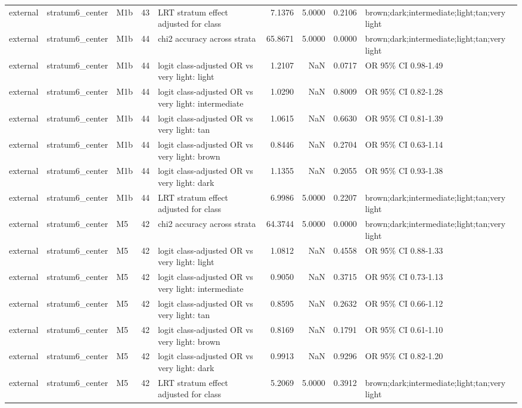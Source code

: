 \begin{tabular}{lllrlrrrl}
external & stratum6\_center & M1b & 43 & LRT stratum effect adjusted for class & 7.1376 & 5.0000 & 0.2106 & brown;dark;intermediate;light;tan;very light \\
external & stratum6\_center & M1b & 44 & chi2 accuracy across strata & 65.8671 & 5.0000 & 0.0000 & brown;dark;intermediate;light;tan;very light \\
external & stratum6\_center & M1b & 44 & logit class-adjusted OR vs very light: light & 1.2107 & NaN & 0.0717 & OR 95\% CI 0.98-1.49 \\
external & stratum6\_center & M1b & 44 & logit class-adjusted OR vs very light: intermediate & 1.0290 & NaN & 0.8009 & OR 95\% CI 0.82-1.28 \\
external & stratum6\_center & M1b & 44 & logit class-adjusted OR vs very light: tan & 1.0615 & NaN & 0.6630 & OR 95\% CI 0.81-1.39 \\
external & stratum6\_center & M1b & 44 & logit class-adjusted OR vs very light: brown & 0.8446 & NaN & 0.2704 & OR 95\% CI 0.63-1.14 \\
external & stratum6\_center & M1b & 44 & logit class-adjusted OR vs very light: dark & 1.1355 & NaN & 0.2055 & OR 95\% CI 0.93-1.38 \\
external & stratum6\_center & M1b & 44 & LRT stratum effect adjusted for class & 6.9986 & 5.0000 & 0.2207 & brown;dark;intermediate;light;tan;very light \\
external & stratum6\_center & M5 & 42 & chi2 accuracy across strata & 64.3744 & 5.0000 & 0.0000 & brown;dark;intermediate;light;tan;very light \\
external & stratum6\_center & M5 & 42 & logit class-adjusted OR vs very light: light & 1.0812 & NaN & 0.4558 & OR 95\% CI 0.88-1.33 \\
external & stratum6\_center & M5 & 42 & logit class-adjusted OR vs very light: intermediate & 0.9050 & NaN & 0.3715 & OR 95\% CI 0.73-1.13 \\
external & stratum6\_center & M5 & 42 & logit class-adjusted OR vs very light: tan & 0.8595 & NaN & 0.2632 & OR 95\% CI 0.66-1.12 \\
external & stratum6\_center & M5 & 42 & logit class-adjusted OR vs very light: brown & 0.8169 & NaN & 0.1791 & OR 95\% CI 0.61-1.10 \\
external & stratum6\_center & M5 & 42 & logit class-adjusted OR vs very light: dark & 0.9913 & NaN & 0.9296 & OR 95\% CI 0.82-1.20 \\
external & stratum6\_center & M5 & 42 & LRT stratum effect adjusted for class & 5.2069 & 5.0000 & 0.3912 & brown;dark;intermediate;light;tan;very light \\

\end{tabular}
